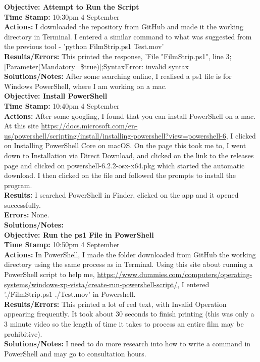 \documentclass{article}
\begin{document}
\textbf{Objective: Attempt to Run the Script}\\
\textbf{Time Stamp:} 10:30pm 4 September\\
\textbf{Actions:} I downloaded the repository from GitHub and made it the working directory in Terminal. I entered a similar command to what was suggested from the previous tool - 'python FilmStrip.ps1 Test.mov'\\
\textbf{Results/Errors:} This printed the response, 'File "FilmStrip.ps1", line 3; [Parameter(Mandatory=\$true)];SyntaxError: invalid syntax\\
\textbf{Solutions/Notes:} After some searching online, I realised a ps1 file is for Windows PowerShell, where I am working on a mac.\\

\textbf{Objective: Install PowerShell}\\
\textbf{Time Stamp:} 10:40pm 4 September\\
\textbf{Actions:} After some googling, I found that you can install PowerShell on a mac. At this site \url{https://docs.microsoft.com/en-us/powershell/scripting/install/installing-powershell?view=powershell-6}, I clicked on Installing PowerShell Core on macOS. On the page this took me to, I went down to Installation via Direct Download, and clicked on the link to the releases page and clicked on powershell-6.2.2-osx-x64.pkg which started the automatic download. I then clicked on the file and followed the prompts to install the program.\\
\textbf{Results:} I searched PowerShell in Finder, clicked on the app and it opened successfully.\\
\textbf{Errors:} None.\\
\textbf{Solutions/Notes:} \\

\textbf{Objective: Run the ps1 File in PowerShell}\\
\textbf{Time Stamp:} 10:50pm 4 September\\
\textbf{Actions:} In PowerShell, I made the folder downloaded from GitHub the working directory using the same process as in Terminal. Using this site about running a PowerShell script to help me, \url{https://www.dummies.com/computers/operating-systems/windows-xp-vista/create-run-powershell-script/}, I entered './FilmStrip.ps1 ./Test.mov' in Powershell. \\
\textbf{Results/Errors:} This printed a lot of red text, with Invalid Operation appearing frequently. It took about 30 seconds to finish printing (this was only a 3 minute video so the length of time it takes to process an entire film may be prohibitive).\\
\textbf{Solutions/Notes:} I need to do more research into how to write a command in PowerShell and may go to consultation hours.\\
\end{document}
